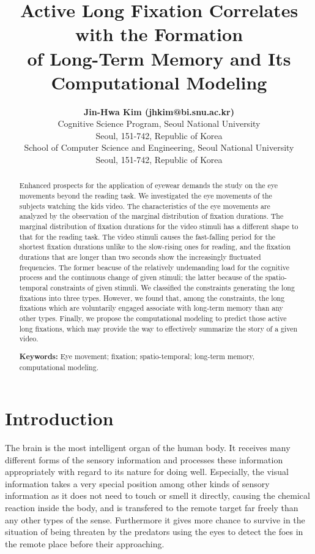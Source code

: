 \documentclass[10pt,letterpaper]{article}
\title{Active Long Fixation Correlates with the Formation \\
  of Long-Term Memory and Its Computational Modeling}
\author{{\large \bf Jin-Hwa Kim (jhkim@bi.snu.ac.kr)} \\
  Cognitive Science Program, Seoul National University \\
  Seoul, 151-742, Republic of Korea
  \AND {\large \bf Byoung-Tak Zhang (btzhang@bi.snu.ac.kr)} \\
  School of Computer Science and Engineering, Seoul National University \\
  Seoul, 151-742, Republic of Korea}
\begin{document}
\maketitle

\begin{abstract}
Enhanced prospects for the application of eyewear demands the study on the eye movements beyond the reading task. We investigated the eye movements of the subjects watching the kids video. The characteristics of the eye movements are analyzed by the observation of the marginal distribution of fixation durations. The marginal distribution of fixation durations for the video stimuli has a different shape to that for the reading task. The video stimuli causes the fast-falling period for the shortest fixation durations unlike to the slow-rising ones for reading, and the fixation durations that are longer than two seconds show the increasingly fluctuated frequencies. The former beacuse of the relatively undemanding load for the cognitive process and the continuous change of given stimuli; the latter because of the spatio-temporal constraints of given stimuli. We classified the constraints generating the long fixations into three types. However, we found that, among the constraints, the long fixations which are voluntarily engaged associate with long-term memory than any other types. Finally, we propose the computational modeling to predict those active long fixations, which may provide the way to effectively summarize the story of a given video.

\textbf{Keywords:} 
Eye movement; fixation; spatio-temporal; long-term memory, computational modeling.
\end{abstract}


\section{Introduction}

The brain is the most intelligent organ of the human body. It receives many different forms of the sensory information and processes these information appropriately with regard to its nature for doing well. Especially, the visual information takes a very special position among other kinds of sensory information as it does not need to touch or smell it directly, causing the chemical reaction inside the body, and is transfered to the remote target far freely than any other types of the sense. Furthermore it gives more chance to survive in the situation of being threaten by the predators using the eyes to detect the foes in the remote place before their approaching. 
\end{document}
